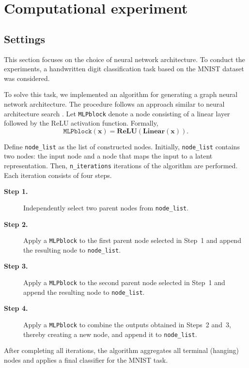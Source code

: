 \section{Computational experiment}
\subsection{Settings}

This section focuses on the choice of neural network architecture. 
To conduct the experiments, a handwritten digit classification task based on the MNIST dataset \cite{Deng2012} was considered.

To solve this task, we implemented an algorithm for generating a graph neural network architecture. 
The procedure follows an approach similar to neural architecture search \cite{Zoph2017}. 
Let \texttt{MLPblock} denote a node consisting of a linear layer followed by the ReLU activation function. 
Formally,
\begin{equation}
\texttt{MLPblock}(\mathbf{x}) = \textbf{ReLU}(\textbf{Linear}(\mathbf{x})).
\end{equation}

Define \texttt{node\_list} as the list of constructed nodes. 
Initially, \texttt{node\_list} contains two nodes: the input node and a node that maps the input to a latent representation. 
Then, \texttt{n\_iterations} iterations of the algorithm are performed. 
Each iteration consists of four steps.

\begin{description}
\item[\textbf{Step 1.}]
Independently select two parent nodes from \texttt{node\_list}.

\item[\textbf{Step 2.}]
Apply a \texttt{MLPblock} to the first parent node selected in Step~1 and append the resulting node to \texttt{node\_list}.

\item[\textbf{Step 3.}]
Apply a \texttt{MLPblock} to the second parent node selected in Step~1 and append the resulting node to \texttt{node\_list}.

\item[\textbf{Step 4.}]
Apply a \texttt{MLPblock} to combine the outputs obtained in Steps~2 and~3, thereby creating a new node, and append it to \texttt{node\_list}.
\end{description}

After completing all iterations, the algorithm aggregates all terminal (hanging) nodes and applies a final classifier for the MNIST task.

